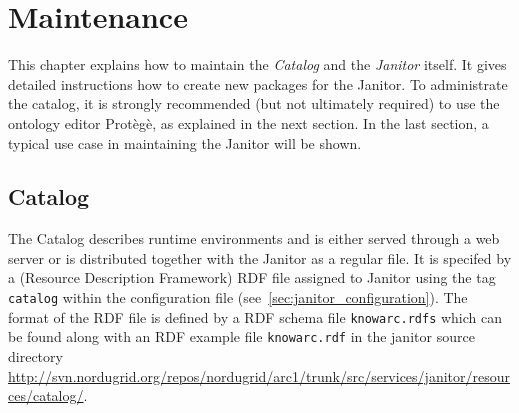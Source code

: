 \chapter{Maintenance}

This chapter explains how to maintain the {\em Catalog} and the {\em Janitor} itself. 
It gives detailed instructions how to create new packages for the Janitor.
To administrate the catalog, it is strongly recommended (but not ultimately required) to use the ontology editor Prot\`eg\`e,
as explained in the next section.
In the last section, a typical use case in maintaining the Janitor will be shown.


\section{Catalog}\label{sec:catalog}

The Catalog describes runtime environments and is either served through a web server or is distributed together with the Janitor as a regular file. 
It is specifed by a (Resource Description Framework) RDF file assigned to 
Janitor using the tag \texttt{catalog} within the configuration file (see~\ref{sec:janitor_configuration}). 
The format of the RDF file is defined by a RDF schema file \texttt{knowarc.rdfs}
which can be found along with an RDF example file \texttt{knowarc.rdf} in the janitor source directory \href{http://svn.nordugrid.org/repos/nordugrid/arc1/trunk/src/services/janitor/resources/catalog/}
{http://svn.nordugrid.org/repos/nordugrid/arc1/trunk/src/services/janitor/resources/catalog/}.\\


